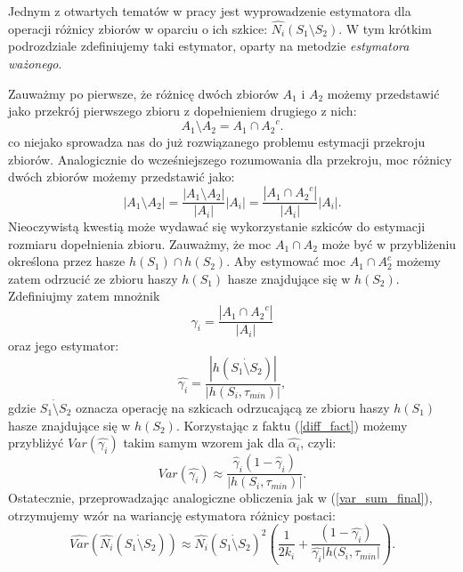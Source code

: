 Jednym z otwartych tematów w pracy \cite{ting} jest wyprowadzenie estymatora dla operacji różnicy zbiorów w oparciu o ich szkice: $\hat{N_i}(S_1 \setminus S_2)$. W tym krótkim podrozdziale zdefiniujemy taki estymator, oparty na metodzie \textit{estymatora ważonego}.

Zauważmy po pierwsze, że różnicę dwóch zbiorów $A_1$ i $A_2$ możemy przedstawić jako przekrój pierwszego zbioru z dopełnieniem drugiego z nich:
\begin{equation}
    A_1 \setminus A_2 = A_1 \cap {A_2}^{c}.
\end{equation}
co niejako sprowadza nas do już rozwiązanego problemu estymacji przekroju zbiorów.
Analogicznie do wcześniejszego rozumowania  dla przekroju, moc różnicy dwóch zbiorów możemy przedstawić jako:
\begin{equation}
    |A_1 \setminus A_2| = \frac{|A_1 \setminus A_2|}{|A_i|}|A_i| = \frac{|A_1 \cap {A_2}^{c}|}{|A_i|}|A_i|.
    \label{diff_fact}
\end{equation}
Nieoczywistą kwestią może wydawać się wykorzystanie szkiców do estymacji rozmiaru dopełnienia zbioru.
Zauważmy, że moc $A_1 \cap A_2$ może być w przybliżeniu określona przez hasze $h(S_1) \cap h(S_2)$.
Aby estymować moc  $A_1 \cap A_2^c$ możemy zatem odrzucić ze zbioru haszy $h(S_1)$ hasze znajdujące się w $h(S_2)$.
Zdefiniujmy zatem mnożnik $${\gamma}_{i} = \frac{|A_1 \cap {A_2}^{c}|}{|A_i|}$$
oraz jego estymator:
\begin{equation}
    \hat{{\gamma}_i} = \frac{|h(S_1 \dot{\setminus} S_2)|}{|h(S_i, {\tau}_{min})|},
\end{equation}
gdzie $S_1 \dot{\setminus} S_2$ oznacza operację na szkicach odrzucającą ze zbioru haszy $h(S_1)$ hasze znajdujące się w $h(S_2)$.
 Korzystając z faktu (\ref{diff_fact})
możemy przybliżyć $Var(\hat{{\gamma}_i})$ takim samym wzorem jak dla $\hat{{\alpha}_i}$, czyli:
\begin{equation}
    Var(\hat{{\gamma}_i}) \approx \frac{{\hat{\gamma}}_i(1 - {\hat{\gamma}}_i)}{|h(S_i, {\tau}_{min})|}.
\end{equation}
Ostatecznie, przeprowadzając analogiczne obliczenia jak w (\ref{var_sum_final}),
 otrzymujemy wzór na wariancję estymatora różnicy postaci:
\begin{equation}
    \hat{Var}(\hat{N_i}(S_1 \dot{\setminus} S_2)) \approx \hat{N_i}(S_1 \dot{\setminus} S_2)^{2}(\frac{1}{2{k}_i} + \frac{(1 - \hat{{\gamma}_i})}{\hat{{\gamma}_i}|h(S_i, {\tau}_{min}|}).
\end{equation}


